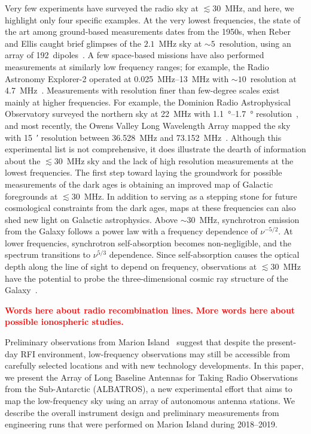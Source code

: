 \documentclass{ws-jai}
\def\albatros{ALBATROS}
\newcommand{\attention}[1]{\textcolor{red}{\bf {#1}}}
\begin{document}
Very few experiments have surveyed the radio sky at $\lesssim 30$~MHz,
and here, we highlight only four specific examples.  At the very
lowest frequencies, the state of the art among ground-based
measurements dates from the 1950s, when Reber and Ellis caught brief
glimpses of the $2.1$~MHz sky at $\sim 5$\degree\ resolution, using an
array of 192~dipoles~\citep{1956JGR....61....1R}.  A few space-based
missions have also performed measurements at similarly low frequency
ranges; for example, the Radio Astronomy Explorer-2 operated at
\SIrange{0.025}{13}{\MHz} with $\sim 10$\degree\ resolution at
\SI{4.7}{\MHz}~\citep{1975A&A....40..365A}.  Measurements with
resolution finer than few-degree scales exist mainly at higher
frequencies.  For example, the Dominion Radio Astrophysical
Observatory surveyed the northern sky at \SI{22}{\MHz} with
\SIrange{1.1}{1.7}{\degree} resolution~\citep{1999A&AS..137....7R},
and most recently, the Owens Valley Long Wavelength Array mapped the
sky with \SI{15}{\arcminute} resolution between 36.528~MHz and
73.152~MHz~\citep{2018AJ....156...32E}.  Although this experimental
list is not comprehensive, it does illustrate the dearth of
information about the $\lesssim 30$~MHz sky and the lack of high
resolution measurements at the lowest frequencies.  The first step
toward laying the groundwork for possible measurements of the dark
ages is obtaining an improved map of Galactic foregrounds at $\lesssim
30$~MHz.  In addition to serving as a stepping stone for future
cosmological constraints from the dark ages, maps at these frequencies
can also shed new light on Galactic astrophysics.  Above $\sim30$~MHz,
synchrotron emission from the Galaxy follows a power law with a
frequency dependence of $\nu^{-5/2}$.  At lower frequencies,
synchrotron self-absorption becomes non-negligible, and the spectrum
transitions to $\nu^{5/3}$ dependence.  Since self-absorption causes
the optical depth along the line of sight to depend on frequency,
observations at $\lesssim 30$~MHz have the potential to probe the
three-dimensional cosmic ray structure of the
Galaxy~\citep{2002ApJ...575..217P}.

\attention{Words here about radio recombination lines.}
\attention{More words here about possible ionospheric studies.}


Preliminary observations from Marion
Island~\citep{2019JAI.....850004P} suggest that despite the
present-day RFI environment, low-frequency observations may still be
accessible from carefully selected locations and with new technology
developments.  In this paper, we present the Array of Long Baseline
Antennas for Taking Radio Observations from the Sub-Antarctic
(\albatros), a new experimental effort that aims to map the
low-frequency sky using an array of autonomous antenna stations.  We
describe the overall instrument design and preliminary measurements
from engineering runs that were performed on Marion Island during
2018--2019.
\end{document}
